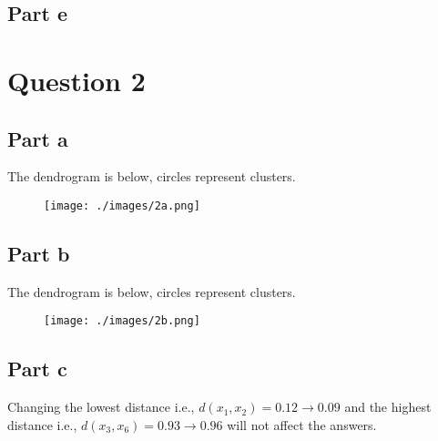 \documentclass{article}
\begin{document}
\subsection*{Part e}

\section*{Question 2}
\subsection*{Part a}
The dendrogram is below, circles represent clusters.
\begin{figure}[H]
\centering
\texttt{[image: ./images/2a.png]}
\end{figure}

\subsection*{Part b}
The dendrogram is below, circles represent clusters.
\begin{figure}[H]
\centering
\texttt{[image: ./images/2b.png]}
\end{figure}

\subsection*{Part c}
Changing the lowest distance i.e., \(d(x_1, x_2) = 0.12 \rightarrow 0.09\) and the highest distance i.e., \(d(x_3, x_6) = 0.93 \rightarrow 0.96\) will not affect the answers.
\end{document}
